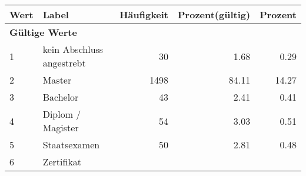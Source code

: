      \begin{longtable}{lXrrr}
     \toprule
     \textbf{Wert} & \textbf{Label} & \textbf{Häufigkeit} & \textbf{Prozent(gültig)} & \textbf{Prozent} \\
     \endhead
     \midrule
     \multicolumn{5}{l}{\textbf{Gültige Werte}}\\

     1 &
     \multicolumn{1}{X}{ kein Abschluss angestrebt   } &


       \num{30} &
       \num[round-mode=places,round-precision=2]{1.68} &
         \num[round-mode=places,round-precision=2]{0.29} \\

     2 &
     \multicolumn{1}{X}{ Master   } &


       \num{1498} &
       \num[round-mode=places,round-precision=2]{84.11} &
         \num[round-mode=places,round-precision=2]{14.27} \\

     3 &
     \multicolumn{1}{X}{ Bachelor   } &


       \num{43} &
       \num[round-mode=places,round-precision=2]{2.41} &
         \num[round-mode=places,round-precision=2]{0.41} \\

     4 &
     \multicolumn{1}{X}{ Diplom / Magister   } &


       \num{54} &
       \num[round-mode=places,round-precision=2]{3.03} &
         \num[round-mode=places,round-precision=2]{0.51} \\

     5 &
     \multicolumn{1}{X}{ Staatsexamen   } &


       \num{50} &
       \num[round-mode=places,round-precision=2]{2.81} &
         \num[round-mode=places,round-precision=2]{0.48} \\

     6 &
     \multicolumn{1}{X}{ Zertifikat   } &



\end{longtable}
